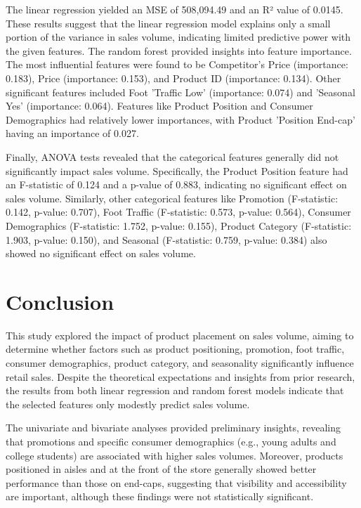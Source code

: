 \documentclass[stu,12pt,floatsintext]{apa7}
\begin{document}
The linear regression yielded an MSE of 508,094.49 and an R² value of 0.0145. These results suggest that the linear regression model explains only a small portion of the variance in sales volume, indicating limited predictive power with the given features. The random forest provided insights into feature importance. The most influential features were found to be Competitor's Price (importance: 0.183), Price (importance: 0.153), and Product ID (importance: 0.134). Other significant features included Foot 'Traffic Low' (importance: 0.074) and 'Seasonal Yes' (importance: 0.064). Features like Product Position and Consumer Demographics had relatively lower importances, with Product 'Position End-cap' having an importance of 0.027.

Finally, ANOVA tests revealed that the categorical features generally did not significantly impact sales volume. Specifically, the Product Position feature had an F-statistic of 0.124 and a p-value of 0.883, indicating no significant effect on sales volume. Similarly, other categorical features like Promotion (F-statistic: 0.142, p-value: 0.707), Foot Traffic (F-statistic: 0.573, p-value: 0.564), Consumer Demographics (F-statistic: 1.752, p-value: 0.155), Product Category (F-statistic: 1.903, p-value: 0.150), and Seasonal (F-statistic: 0.759, p-value: 0.384) also showed no significant effect on sales volume.

\section{Conclusion}

This study explored the impact of product placement on sales volume, aiming to determine whether factors such as product positioning, promotion, foot traffic, consumer demographics, product category, and seasonality significantly influence retail sales. Despite the theoretical expectations and insights from prior research, the results from both linear regression and random forest models indicate that the selected features only modestly predict sales volume.

The univariate and bivariate analyses provided preliminary insights, revealing that promotions and specific consumer demographics (e.g., young adults and college students) are associated with higher sales volumes. Moreover, products positioned in aisles and at the front of the store generally showed better performance than those on end-caps, suggesting that visibility and accessibility are important, although these findings were not statistically significant.
\end{document}
